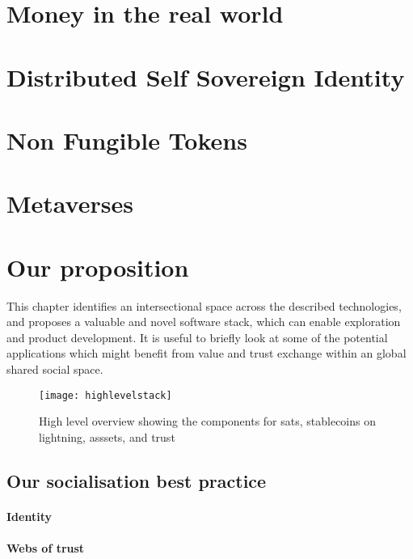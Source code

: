 \documentclass[
	12pt, %
	fleqn, %
	a4paper, %
	oneside, %
]{LegrandOrangeBook}
\begin{document}
\chapter{Money in the real world}


%

\chapter{Distributed Self Sovereign Identity}


\chapter{Non Fungible Tokens}


\chapter{Metaverses}


\chapter{Our proposition}
This chapter identifies an intersectional space across the described technologies, and proposes a valuable and novel software stack, which can enable exploration  and product development. It is useful to briefly look at some of the potential applications which might benefit from value and trust exchange within an global shared social space.

\begin{figure*}[ht]\centering 	\texttt{[image: highlevelstack]}
	\caption{High level overview showing the components for sats, stablecoins on lightning, asssets, and trust}
	\label{fig:highlevelstack}
\end{figure*}


\section{Our socialisation best practice}
\subsubsection{Identity}
\subsubsection{Webs of trust}
\end{document}
